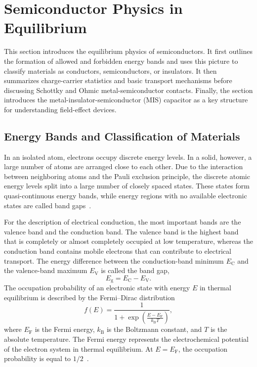 \section{Semiconductor Physics in Equilibrium}

This section introduces the equilibrium physics of semiconductors. It first outlines the formation of allowed and forbidden energy bands and uses this picture to classify materials as conductors, semiconductors, or insulators. It then summarizes charge-carrier statistics and basic transport mechanisms before discussing Schottky and Ohmic metal-semiconductor contacts. Finally, the section introduces the metal-insulator-semiconductor (MIS) capacitor as a key structure for understanding field-effect devices.

\subsection{Energy Bands and Classification of Materials}
In an isolated atom, electrons occupy discrete energy levels. In a solid,
however, a large number of atoms are arranged close to each other. Due to the
interaction between neighboring atoms and the Pauli exclusion principle, the
discrete atomic energy levels split into a large number of closely spaced
states. These states form quasi-continuous energy bands, while energy regions
with no available electronic states are called band gaps~\cite{Kittel2004,Neamen}.

For the description of electrical conduction, the most important bands are the valence band and the conduction band. The valence band is the highest band that is completely or almost completely occupied at low temperature, whereas the
conduction band contains mobile electrons that can contribute to electrical transport. The energy difference between the conduction-band minimum $E_\mathrm{C}$ and the valence-band maximum $E_\mathrm{V}$ is called the band gap,
\begin{equation}
    E_\mathrm{g} = E_\mathrm{C} - E_\mathrm{V}.
\end{equation}
The occupation probability of an electronic state with energy $E$ in thermal equilibrium is described by the Fermi--Dirac distribution
\begin{equation}
    f(E) =
    \frac{1}{1 + \exp\left(\frac{E-E_\mathrm{F}}{k_\mathrm{B}T}\right)},
\end{equation}
where $E_\mathrm{F}$ is the Fermi energy, $k_\mathrm{B}$ is the Boltzmann constant, and $T$ is the absolute temperature. The Fermi energy represents the electrochemical potential of the electron system in thermal equilibrium. At $E=E_\mathrm{F}$, the occupation probability is equal to $1/2$~\cite{Neamen}.

